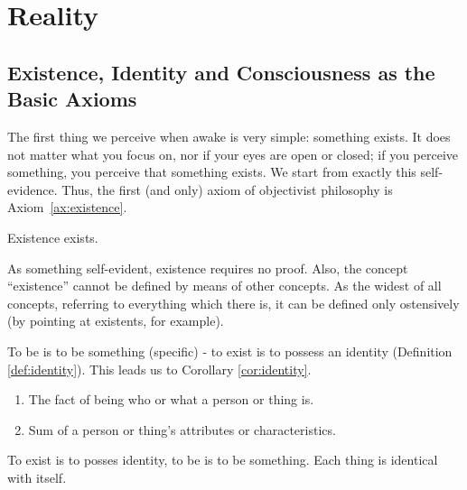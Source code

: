 \chapter{Reality}

    \section{Existence, Identity and Consciousness as the Basic Axioms}

        The first thing we perceive when awake is very simple: something exists.
        It does not matter what you focus on, nor if your eyes are open or closed;
            if you perceive something, you perceive that something exists.
        We start from exactly this self-evidence.
        Thus, the first (and only) axiom of objectivist philosophy is Axiom~\ref{ax:existence}.
    
            \begin{axiom}[Existence]
            \label{ax:existence}
                Existence exists.
            \end{axiom}
            
        As something self-evident, existence requires no proof. Also, the concept ``existence'' cannot be defined by means of other concepts. As the widest of all concepts, referring to everything which there is, it can be defined only ostensively (by pointing at existents, for example).

        To be is to be something (specific) - to exist is to possess an identity (Definition \ref{def:identity}). This leads us to Corollary \ref{cor:identity}.
            
            \begin{definition}[Identity]
            \label{def:identity}
                \begin{enumerate}
                    \item The fact of being who or what a person or thing is.
                    \item Sum of a person or thing's attributes or characteristics.
                \end{enumerate}
            \end{definition}
        
            \begin{corollary}
            \label{cor:identity}
                To exist is to posses identity, to be is to be something. Each thing is identical with itself.
            \end{corollary}

